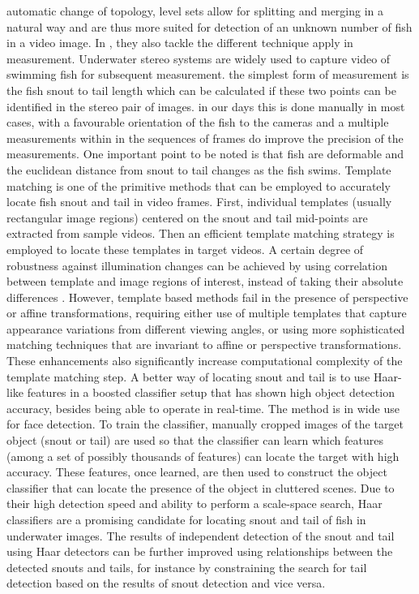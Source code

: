 automatic change of topology, level sets allow for splitting 
and merging in a natural way and are thus more suited for detection of an unknown
number of fish in a video image. 
In \citet{Shortis2013}, they also tackle the different technique apply in measurement.
Underwater stereo systems are widely used to capture video of swimming fish for 
subsequent measurement. the simplest form of measurement is the fish snout to tail 
length which can be calculated if these two points can be identified in the stereo 
pair of images. in our days this is done manually in most cases, with a favourable 
orientation of the fish to the cameras and a multiple measurements within in the 
sequences of frames do improve the precision of the measurements. One important 
point to be noted is that fish are deformable and the euclidean distance from snout to tail
changes as the fish swims.
Template matching is one of the primitive methods that can be employed to accurately 
locate fish snout and tail in video frames. First, individual templates (usually 
rectangular image regions) centered on the snout and tail mid-points are extracted 
from sample videos. Then an efficient template matching strategy is employed to 
locate these templates in target videos. A certain degree of robustness against 
illumination changes can be achieved by using correlation between template and 
image regions of interest, instead of taking their absolute differences \citep{Mahmood2012}.
However, template based methods fail in the presence of perspective or affine transformations, 
requiring either use of multiple templates that capture appearance variations from 
different viewing angles, or using more sophisticated matching techniques that are 
invariant to affine or perspective transformations. 
These enhancements also significantly increase computational complexity of the template matching step.
A better way of locating snout and tail is to use Haar-like features in a boosted 
classifier setup \citep{Viola2001} that has shown high object detection accuracy, 
besides being able to operate in real-time. The method is in wide use for face detection.
To train the classifier, manually cropped images of the target object (snout or tail) are used so that the classifier can learn which features (among a set of possibly thousands of features) can locate the target with high accuracy. These features, once learned, are then used to construct the object classifier that can locate the presence of the object in cluttered scenes. Due to their high detection speed and ability to perform a scale-space search, Haar classifiers are a promising candidate for locating snout and tail of fish in underwater images. The results of independent detection of the snout and tail using Haar detectors can be further improved using relationships between the detected snouts and tails, for instance by constraining the search for tail detection based on the results of snout detection and vice versa.

